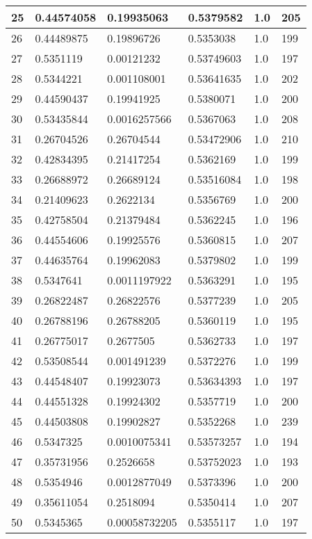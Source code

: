 \begin{longtable}{|l|l|l|l|l|l|}
25 & 0.44574058 & 0.19935063 & 0.5379582 & 1.0 & 205 \\ \hline 
26 & 0.44489875 & 0.19896726 & 0.5353038 & 1.0 & 199 \\ \hline 
27 & 0.5351119 & 0.00121232 & 0.53749603 & 1.0 & 197 \\ \hline 
28 & 0.5344221 & 0.001108001 & 0.53641635 & 1.0 & 202 \\ \hline 
29 & 0.44590437 & 0.19941925 & 0.5380071 & 1.0 & 200 \\ \hline 
30 & 0.53435844 & 0.0016257566 & 0.5367063 & 1.0 & 208 \\ \hline 
31 & 0.26704526 & 0.26704544 & 0.53472906 & 1.0 & 210 \\ \hline 
32 & 0.42834395 & 0.21417254 & 0.5362169 & 1.0 & 199 \\ \hline 
33 & 0.26688972 & 0.26689124 & 0.53516084 & 1.0 & 198 \\ \hline 
34 & 0.21409623 & 0.2622134 & 0.5356769 & 1.0 & 200 \\ \hline 
35 & 0.42758504 & 0.21379484 & 0.5362245 & 1.0 & 196 \\ \hline 
36 & 0.44554606 & 0.19925576 & 0.5360815 & 1.0 & 207 \\ \hline 
37 & 0.44635764 & 0.19962083 & 0.5379802 & 1.0 & 199 \\ \hline 
38 & 0.5347641 & 0.0011197922 & 0.5363291 & 1.0 & 195 \\ \hline 
39 & 0.26822487 & 0.26822576 & 0.5377239 & 1.0 & 205 \\ \hline 
40 & 0.26788196 & 0.26788205 & 0.5360119 & 1.0 & 195 \\ \hline 
41 & 0.26775017 & 0.2677505 & 0.5362733 & 1.0 & 197 \\ \hline 
42 & 0.53508544 & 0.001491239 & 0.5372276 & 1.0 & 199 \\ \hline 
43 & 0.44548407 & 0.19923073 & 0.53634393 & 1.0 & 197 \\ \hline 
44 & 0.44551328 & 0.19924302 & 0.5357719 & 1.0 & 200 \\ \hline 
45 & 0.44503808 & 0.19902827 & 0.5352268 & 1.0 & 239 \\ \hline 
46 & 0.5347325 & 0.0010075341 & 0.53573257 & 1.0 & 194 \\ \hline 
47 & 0.35731956 & 0.2526658 & 0.53752023 & 1.0 & 193 \\ \hline 
48 & 0.5354946 & 0.0012877049 & 0.5373396 & 1.0 & 200 \\ \hline 
49 & 0.35611054 & 0.2518094 & 0.5350414 & 1.0 & 207 \\ \hline 
50 & 0.5345365 & 0.00058732205 & 0.5355117 & 1.0 & 197 \\ \hline 
\end{longtable}